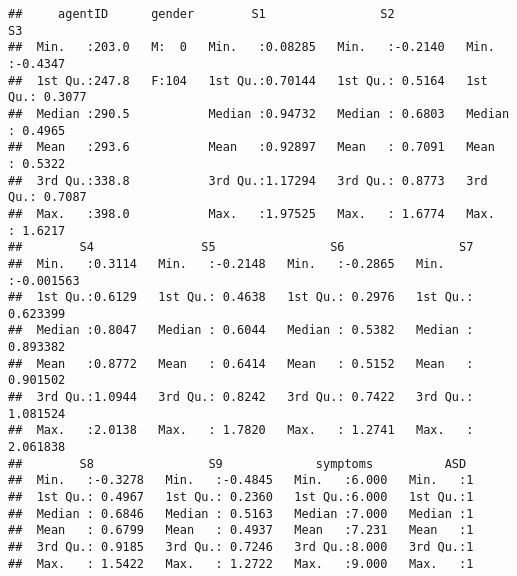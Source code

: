 \documentclass[]{article}
\newenvironment{Shaded}{\begin{snugshade}}{\end{snugshade}}
\newcommand{\KeywordTok}[1]{\textcolor[rgb]{0.13,0.29,0.53}{\textbf{#1}}}
\newcommand{\DecValTok}[1]{\textcolor[rgb]{0.00,0.00,0.81}{#1}}
\newcommand{\StringTok}[1]{\textcolor[rgb]{0.31,0.60,0.02}{#1}}
\newcommand{\CommentTok}[1]{\textcolor[rgb]{0.56,0.35,0.01}{\textit{#1}}}
\newcommand{\OperatorTok}[1]{\textcolor[rgb]{0.81,0.36,0.00}{\textbf{#1}}}
\newcommand{\NormalTok}[1]{#1}
\begin{document}
\begin{verbatim}
##     agentID      gender        S1                S2                S3         
##  Min.   :203.0   M:  0   Min.   :0.08285   Min.   :-0.2140   Min.   :-0.4347  
##  1st Qu.:247.8   F:104   1st Qu.:0.70144   1st Qu.: 0.5164   1st Qu.: 0.3077  
##  Median :290.5           Median :0.94732   Median : 0.6803   Median : 0.4965  
##  Mean   :293.6           Mean   :0.92897   Mean   : 0.7091   Mean   : 0.5322  
##  3rd Qu.:338.8           3rd Qu.:1.17294   3rd Qu.: 0.8773   3rd Qu.: 0.7087  
##  Max.   :398.0           Max.   :1.97525   Max.   : 1.6774   Max.   : 1.6217  
##        S4               S5                S6                S7           
##  Min.   :0.3114   Min.   :-0.2148   Min.   :-0.2865   Min.   :-0.001563  
##  1st Qu.:0.6129   1st Qu.: 0.4638   1st Qu.: 0.2976   1st Qu.: 0.623399  
##  Median :0.8047   Median : 0.6044   Median : 0.5382   Median : 0.893382  
##  Mean   :0.8772   Mean   : 0.6414   Mean   : 0.5152   Mean   : 0.901502  
##  3rd Qu.:1.0944   3rd Qu.: 0.8242   3rd Qu.: 0.7422   3rd Qu.: 1.081524  
##  Max.   :2.0138   Max.   : 1.7820   Max.   : 1.2741   Max.   : 2.061838  
##        S8                S9             symptoms          ASD   
##  Min.   :-0.3278   Min.   :-0.4845   Min.   :6.000   Min.   :1  
##  1st Qu.: 0.4967   1st Qu.: 0.2360   1st Qu.:6.000   1st Qu.:1  
##  Median : 0.6846   Median : 0.5163   Median :7.000   Median :1  
##  Mean   : 0.6799   Mean   : 0.4937   Mean   :7.231   Mean   :1  
##  3rd Qu.: 0.9185   3rd Qu.: 0.7246   3rd Qu.:8.000   3rd Qu.:1  
##  Max.   : 1.5422   Max.   : 1.2722   Max.   :9.000   Max.   :1
\end{verbatim}

\begin{Shaded}
\end{Shaded}
\end{document}
